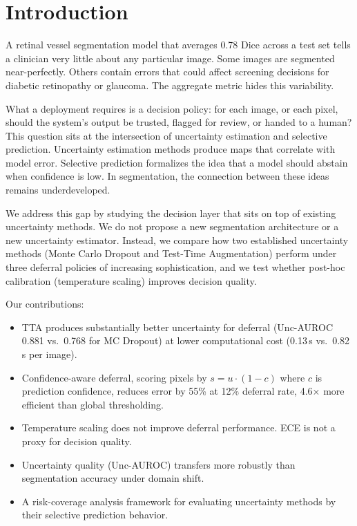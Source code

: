 \documentclass[review,3p]{elsarticle}
\begin{document}
\section{Introduction}

A retinal vessel segmentation model that averages 0.78 Dice across a test set
tells a clinician very little about any particular image. Some images are
segmented near-perfectly. Others contain errors that could affect screening
decisions for diabetic retinopathy or glaucoma. The aggregate metric hides this
variability.

What a deployment requires is a decision policy: for each image, or each pixel,
should the system's output be trusted, flagged for review, or handed to a
human? This question sits at the intersection of uncertainty estimation and
selective prediction. Uncertainty estimation methods produce maps that
correlate with model error. Selective prediction formalizes the idea that a
model should abstain when confidence is low. In segmentation, the connection
between these ideas remains underdeveloped.

We address this gap by studying the decision layer that sits on top of existing
uncertainty methods. We do not propose a new segmentation architecture or a new
uncertainty estimator. Instead, we compare how two established uncertainty
methods (Monte Carlo Dropout and Test-Time Augmentation) perform under three
deferral policies of increasing sophistication, and we test whether post-hoc
calibration (temperature scaling) improves decision quality.

Our contributions:
\begin{itemize}
\item TTA produces substantially better uncertainty for deferral (Unc-AUROC
0.881 vs.\ 0.768 for MC Dropout) at lower computational cost (0.13\,s vs.\
0.82\,s per image).
\item Confidence-aware deferral, scoring pixels by $s = u \cdot (1-c)$ where
$c$ is prediction confidence, reduces error by 55\% at 12\% deferral rate,
4.6$\times$ more efficient than global thresholding.
\item Temperature scaling does not improve deferral performance. ECE is not a
proxy for decision quality.
\item Uncertainty quality (Unc-AUROC) transfers more robustly than segmentation
accuracy under domain shift.
\item A risk-coverage analysis framework for evaluating uncertainty methods by
their selective prediction behavior.
\end{itemize}
\end{document}
